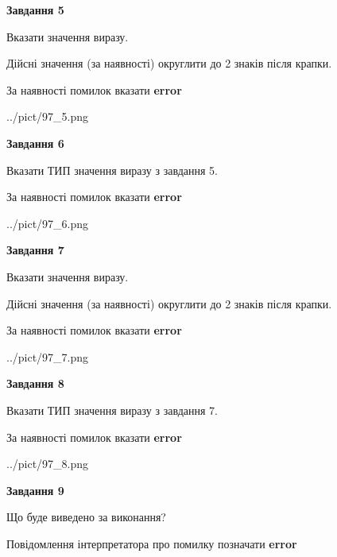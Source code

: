 \documentclass[11pt, ukrainian]{article}
\begin{document}
{\begin {large}
{\begin {center}\textbf{Завдання 5}\end {center}}\par
Вказати значення виразу. \par
Дійсні значення (за наявності) округлити до 2 знаків після крапки. \par
За наявності помилок вказати \textbf{error}

\begin{center}
	{../pict/97_5.png}
\end{center}
\newpage

{\begin {center}\textbf{Завдання 6}\end {center}}\par
Вказати ТИП значення виразу з завдання 5. \par
За наявності помилок вказати \textbf{error}

\begin{center}
	{../pict/97_6.png}
\end{center}
\newpage

{\begin {center}\textbf{Завдання 7}\end {center}}\par
Вказати значення виразу. \par
Дійсні значення (за наявності) округлити до 2 знаків після крапки. \par
За наявності помилок вказати \textbf{error}

\begin{center}
	{../pict/97_7.png}
\end{center}
\newpage

{\begin {center}\textbf{Завдання 8}\end {center}}\par
Вказати ТИП значення виразу з завдання 7. \par
За наявності помилок вказати \textbf{error}

\begin{center}
	{../pict/97_8.png}
\end{center}
\newpage

{\begin {center}\textbf{Завдання 9}\end {center}}\par
Що буде виведено за виконання? \par
Повідомлення інтерпретатора про помилку позначати \textbf{error}


\end{large}}
\end{document}
